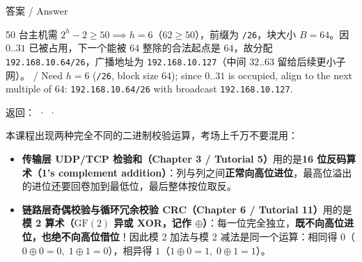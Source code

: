 \begin{StudySolution}{答案 / Answer}


50 台主机需 \(2^h - 2 \ge 50 \implies h = 6\)（\(62 \ge 50\)），前缀为 \texttt{/26}，块大小 \(B = 64\)。因 \(0..31\) 已被占用，下一个能被 \(64\) 整除的合法起点是 \(64\)，故分配 \texttt{192.168.10.64/26}，广播地址为 \texttt{192.168.10.127}（中间 \(32..63\) 留给后续更小子网）。 / Need \(h=6\) (\texttt{/26}, block size \(64\)); since \(0..31\) is occupied, align to the next multiple of \(64\): \texttt{192.168.10.64/26} with broadcast \texttt{192.168.10.127}.


\end{StudySolution}


返回： ·  · 








本课程出现两种完全不同的二进制校验运算，考场上千万不要混用：
\begin{itemize}
\item \textbf{传输层 UDP/TCP 检验和（Chapter 3 / Tutorial 5）}用的是\textbf{16 位反码算术（1's complement addition）}：列与列之间\textbf{正常向高位进位}，最高位溢出的进位还要回卷加到最低位，最后整体按位取反。
\item \textbf{链路层奇偶校验与循环冗余校验 CRC（Chapter 6 / Tutorial 11）}用的是\textbf{模 2 算术（\(\mathrm{GF}(2)\) 异或 XOR，记作 \(\oplus\)）}：每一位完全独立，\textbf{既不向高位进位，也绝不向高位借位}！因此模 2 加法与模 2 减法是同一个运算：相同得 \(0\)（\(0\oplus 0=0,\; 1\oplus 1=0\)），相异得 \(1\)（\(1\oplus 0=1,\; 0\oplus 1=1\)）。
\end{itemize}


